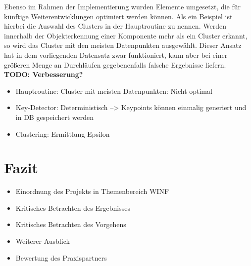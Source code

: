 \documentclass[
    type=Projektarbeit,
    status=draft, %
    language=german, %
    bibengine=bibtex,
]{unibwm-inf-thesis}
\newcommand{\todo}[1]{\textbf{TODO: #1}}
\begin{document}
    Ebenso im Rahmen der Implementierung wurden Elemente umgesetzt, die für künftige Weiterentwicklungen optimiert werden können.
    Als ein Beispiel ist hierbei die Auswahl des Clusters in der Hauptroutine zu nennen.
    Werden innerhalb der Objekterkennung einer Komponente mehr als ein Cluster erkannt, so wird das Cluster mit den meisten Datenpunkten ausgewählt.
    Dieser Ansatz hat in dem vorliegenden Datensatz zwar funktioniert, kann aber bei einer größeren Menge an Durchläufen gegebenenfalls falsche Ergebnisse liefern.
    \todo{Verbesserung?}




    \begin{itemize}
        \item Hauptroutine: Cluster mit meisten Datenpunkten: Nicht optimal
        \item Key-Detector: Deterministisch --> Keypoints können einmalig generiert und in DB gespeichert werden
        \item Clustering: Ermittlung Epsilon
    \end{itemize}
   \chapter{Fazit}

    \begin{itemize}
        \item Einordnung des Projekts in Themenbereich WINF
        \item Kritisches Betrachten des Ergebnisses
        \item Kritisches Betrachten des Vorgehens
        \item Weiterer Ausblick
        \item Bewertung des Praxispartners
    \end{itemize}




    
    \backmatter
    
    
    
\end{document}
